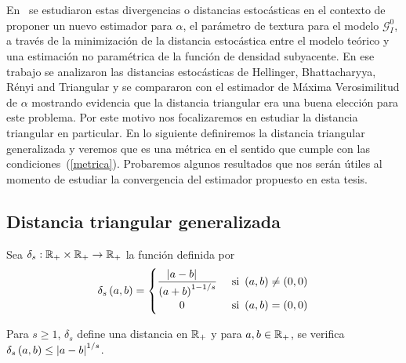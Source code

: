 En~\citet{APSAR2013ParameterEstimationStochasticDistances} se estudiaron estas divergencias o distancias estocásticas en el contexto de proponer un nuevo estimador para $\alpha$, el parámetro de textura para el modelo $\mathcal{G}_I^0$, a través de la minimización de la distancia estocástica entre el modelo teórico y una estimación no paramétrica de la función de densidad subyacente. En ese trabajo se analizaron las distancias estocásticas de Hellinger, Bhattacharyya, R\'enyi and Triangular y se compararon con el estimador de Máxima Verosimilitud de $\alpha$ mostrando evidencia que la distancia triangular era una buena elección para este problema. Por este motivo nos focalizaremos en estudiar la distancia triangular en particular. En lo siguiente definiremos la distancia triangular generalizada y veremos que es una métrica en el sentido que cumple con las condiciones~(\ref{metrica}). Probaremos algunos resultados que nos serán útiles al momento de estudiar la convergencia del estimador propuesto en esta tesis.

\subsection{Distancia triangular generalizada}

Sea $\delta_{s}:\mathbb{R}_{+}\times\mathbb{R}_{+}\to\mathbb{R}_{+}$ la función definida por
\begin{align*}
\delta_{s}\left( a,b \right) = 
\begin{cases}
\dfrac{\left| a - b \right|\ \ \ }{\left( a + b \right)^{1-1/s}} & \text{ si } \left( a,b \right) \ne \left( 0,0 \right) \\
\qquad 0 &  \text{ si } \left( a,b \right) = \left( 0,0 \right)
\end{cases}
\end{align*}

\begin{lemma}
	Para $s\ge 1$, $\delta_{s}$ define una distancia en $\mathbb{R}_{+}$ y para $a,b\in\mathbb{R}_{+}$, se verifica $\delta_{s}\left( a,b \right) \le \left| a-b \right|^{1/s}$.
\end{lemma}

